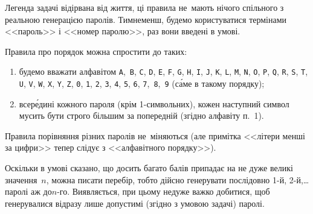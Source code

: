 \def\veryLongExamplesFontSize{normalsize}

\Tutorial	Легенда задачі відірвана від життя, ці правила не~мають нічого спільного з реальною генерацією паролів. Тим\nolinebreak[2] не\nolinebreak[3] менш, будемо користуватися термінами <<пароль>> і <<номер паролю>>, раз вони введені в умові.

Правила про порядок можна спростити до таких:
\begin{enumerate}
\item
будемо вважати алфавітом \texttt{A},~\texttt{B}, \texttt{C}, \texttt{D}, \texttt{E}, \texttt{F}, \texttt{G}, \texttt{H}, \texttt{I}, \texttt{J}, \texttt{K}, \texttt{L}, \texttt{M}, \texttt{N}, \texttt{O}, \texttt{P}, \texttt{Q}, \texttt{R}, \texttt{S}, \texttt{T}, \texttt{U}, \texttt{V}, \texttt{W}, \texttt{X}, \texttt{Y}, \texttt{Z}, \texttt{0}, \texttt{1}, \texttt{2}, \texttt{3}, \texttt{4}, \texttt{5}, \texttt{6}, \texttt{7},~\texttt{8},~\texttt{9} (с\'{а}ме в такому порядку);
\item
всер\'{е}дині кожного пароля (крім 1-символьних), кожен наступний символ мусить бути строго більшим за попередній (згідно алфавіту п.~1).
\end{enumerate}

Правила порівняння різних паролів не~міняються (але примітка <<літери менші за цифри>> тепер слідує з <<алфавітного порядку>>).

Оскільки в умові сказано, що досить багато балів припадає на не дуже великі значення~$n$, можна писати перебір, тобто дійсно генерувати послідовно \mbox{1-й}, \mbox{2-й},\nolinebreak[3] \dots{} паролі аж до\nolinebreak[2] \mbox{$n$-го}. Виявляється, при цьому не\nolinebreak[3] дуже важко добитися, щоб генерувалися відразу лише допустимі (згідно з умовою задачі) паролі.

